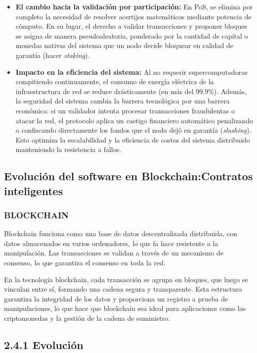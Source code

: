 \documentclass[12pt,a4paper]{article}
\begin{document}
\begin{itemize}
    \item \textbf{El cambio hacia la validación por participación:} En PoS, se elimina por completo la necesidad de resolver acertijos matemáticos mediante potencia de cómputo. En su lugar, el derecho a validar transacciones y proponer bloques se asigna de manera pseudoaleatoria, ponderado por la cantidad de capital o monedas nativas del sistema que un nodo decide bloquear en calidad de garantía (hacer \textit{staking}).
    \item \textbf{Impacto en la eficiencia del sistema:} Al no requerir supercomputadoras compitiendo continuamente, el consumo de energía eléctrica de la infraestructura de red se reduce drásticamente (en más del 99.9\%). Además, la seguridad del sistema cambia la barrera tecnológica por una barrera económica: si un validador intenta procesar transacciones fraudulentas o atacar la red, el protocolo aplica un castigo financiero automático penalizando o confiscando directamente los fondos que el nodo dejó en garantía (\textit{slashing}). Esto optimiza la escalabilidad y la eficiencia de costos del sistema distribuido manteniendo la resistencia a fallos.
\end{itemize}

\subsection{Evolución del software en Blockchain:Contratos inteligentes}

\subsubsection*{BLOCKCHAIN}

Blockchain funciona como una base de datos descentralizada distribuida, con datos almacenados en varios ordenadores, lo que la hace resistente a la manipulación. Las transacciones se validan a través de un mecanismo de consenso, lo que garantiza el consenso en toda la red.

En la tecnología blockchain, cada transacción se agrupa en bloques, que luego se vinculan entre sí, formando una cadena segura y transparente. Esta estructura garantiza la integridad de los datos y proporciona un registro a prueba de manipulaciones, lo que hace que blockchain sea ideal para aplicaciones como las criptomonedas y la gestión de la cadena de suministro.

\subsection*{2.4.1 Evolución}
\end{document}
